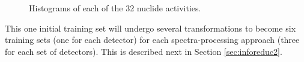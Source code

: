 \begin{figure}[!htb]
  \caption{Histograms of each of the 32 nuclide activities.}
  \label{fig:actshist}
\end{figure}

This one initial training set will undergo several transformations to become
six training sets (one for each detector) for each spectra-processing approach
(three for each set of detectors).  This is described next in Section
\ref{sec:inforeduc2}.
